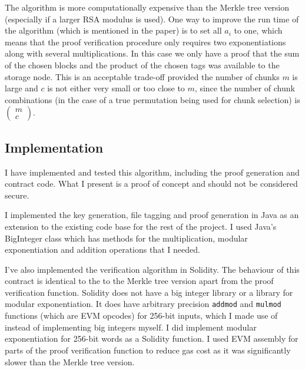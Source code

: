 \documentclass[12pt,a4paper,twoside,openright]{report}
\begin{document}
The algorithm is more computationally expensive than the Merkle tree version (especially if a larger RSA modulus is used).
One way to improve the run time of the algorithm (which is mentioned in the paper) is to set all $a_i$ to one,
which means that the proof verification procedure only requires two exponentiations along with several multiplications.
In this case we only have a proof that the sum of the chosen blocks and the product of the chosen tags was available to the storage node.
This is an acceptable trade-off provided the number of chunks $m$ is large and $c$ is not either very small or too close to $m$,
since the number of chunk combinations (in the case of a true permutation being used for chunk selection) is $\begin{pmatrix}m\\c\end{pmatrix}$.


\subsection{Implementation}

I have implemented and tested this algorithm, including the proof generation and contract code.
What I present is a proof of concept and should not be considered secure.%

I implemented the key generation, file tagging and proof generation in Java as an extension to the existing code base for the rest of the project.
I used Java's BigInteger class which has methods for the multiplication, modular exponentiation and addition operations that I needed.

I've also implemented the verification algorithm in Solidity.
The behaviour of this contract is identical to the to the Merkle tree version apart from the proof verification function.
Solidity does not have a big integer library or a library for modular exponentiation.
It does have arbitrary precision \texttt{addmod} and \texttt{mulmod} functions (which are EVM opcodes) for 256-bit inputs,
which I made use of instead of implementing big integers myself.
I did implement modular exponentiation for 256-bit words as a Solidity function.
I used EVM assembly for parts of the proof verification function to reduce gas cost
as it was significantly slower than the Merkle tree version.
\end{document}
